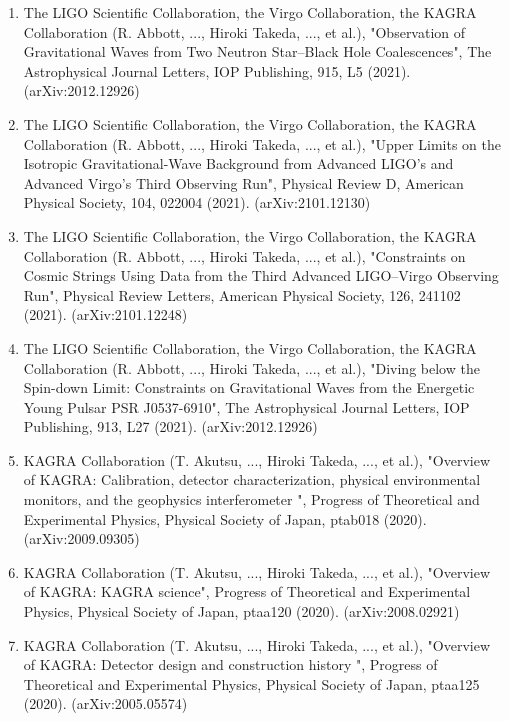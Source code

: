 \documentclass[12pt,a4paper]{article}
\begin{document}
\begin{enumerate}
\item The LIGO Scientific Collaboration, the Virgo Collaboration, the KAGRA Collaboration (R. Abbott, ..., Hiroki Takeda, ..., et al.), "Observation of Gravitational Waves from Two Neutron Star–Black Hole Coalescences", The Astrophysical Journal Letters, IOP Publishing, 915, L5 (2021). (arXiv:2012.12926)

\item The LIGO Scientific Collaboration, the Virgo Collaboration, the KAGRA Collaboration (R. Abbott, ..., Hiroki Takeda, ..., et al.), "Upper Limits on the Isotropic Gravitational-Wave Background from Advanced LIGO's and Advanced Virgo's Third Observing Run", Physical Review D, American Physical Society, 104, 022004 (2021). (arXiv:2101.12130)

\item The LIGO Scientific Collaboration, the Virgo Collaboration, the KAGRA Collaboration (R. Abbott, ..., Hiroki Takeda, ..., et al.), "Constraints on Cosmic Strings Using Data from the Third Advanced LIGO–Virgo Observing Run", Physical Review Letters, American Physical Society, 126, 241102 (2021). (arXiv:2101.12248)

\item The LIGO Scientific Collaboration, the Virgo Collaboration, the KAGRA Collaboration (R. Abbott, ..., Hiroki Takeda, ..., et al.), "Diving below the Spin-down Limit: Constraints on Gravitational Waves from the Energetic Young Pulsar PSR J0537-6910", The Astrophysical Journal Letters, IOP Publishing, 913, L27 (2021). (arXiv:2012.12926)

\item KAGRA Collaboration (T. Akutsu, ..., Hiroki Takeda, ..., et al.), "Overview of KAGRA: Calibration, detector characterization, physical environmental monitors, and the geophysics interferometer ", Progress of Theoretical and Experimental Physics, Physical Society of Japan, ptab018 (2020). (arXiv:2009.09305)

\item KAGRA Collaboration (T. Akutsu, ..., Hiroki Takeda, ..., et al.), "Overview of KAGRA: KAGRA science", Progress of Theoretical and Experimental Physics, Physical Society of Japan, ptaa120 (2020). (arXiv:2008.02921)

\item KAGRA Collaboration (T. Akutsu, ..., Hiroki Takeda, ..., et al.), "Overview of KAGRA: Detector design and construction history ", Progress of Theoretical and Experimental Physics, Physical Society of Japan, ptaa125 (2020). (arXiv:2005.05574)


\end{enumerate}
\end{document}

